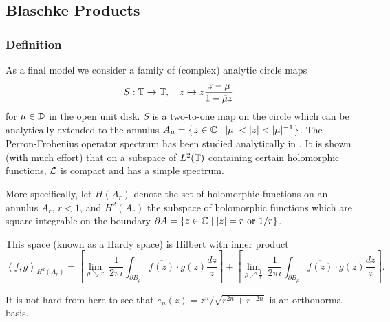 \subsection{Blaschke Products}\label{sec:blaschke}

\subsubsection{Definition}

As a final model we consider a family of (complex) analytic circle maps
\begin{equation}
    \label{eq:blaschke}
    S : \mathbb{T} \to \mathbb{T},\quad z \mapsto z \frac{z - \mu}{1 - \bar{\mu} z} 
\end{equation}
for $\mu \in \mathbb{D}$ in the open unit disk. $S$ is a two-to-one map on the circle 
which can be analytically extended to the annulus 
$A_\mu = \left\{ z \in \mathbb{C} \mid |\mu| < |z| < |\mu|^{-1} \right\}$. The Perron-Frobenius 
operator spectrum has been studied analytically in \cite{Slipantschuk}. It is shown 
(with much effort) that on a subspace of $L^2 (\mathbb{T})$ containing certain holomorphic 
functions, $\mathcal{L}$ is compact and has a simple spectrum. 

More specifically, let 
$H (A_r)$ denote the set of holomorphic functions on an annulus $A_r$, $r < 1$, and $H^2 (A_r)$ 
the subspace of holomorphic functions which are square integrable on the boundary 
$\partial A = \left\{ z \in \mathbb{C} \mid |z| = r \text{ or } 1/r \right\}$. 

This space (known as a Hardy space) is Hilbert with inner product 
\begin{equation}
    {\left\langle f, g \right\rangle}_{H^2 (A_r)}
    = \left[ \lim_{\rho \searrow r}\ \frac{1}{2 \pi i} \int_{\partial B_\rho} \overline{f (z)} \cdot g (z) \frac{dz}{z} \right]
    + \left[ \lim_{\rho \nearrow \frac{1}{r}}\ \frac{1}{2 \pi i} \int_{\partial B_\rho} \overline{f (z)} \cdot g (z) \frac{dz}{z} \right] . 
\end{equation}

It is not hard from here to see that $e_n (z) = z^n / \sqrt{r^{2n} + r^{-2n}}$ is an 
orthonormal basis. 

